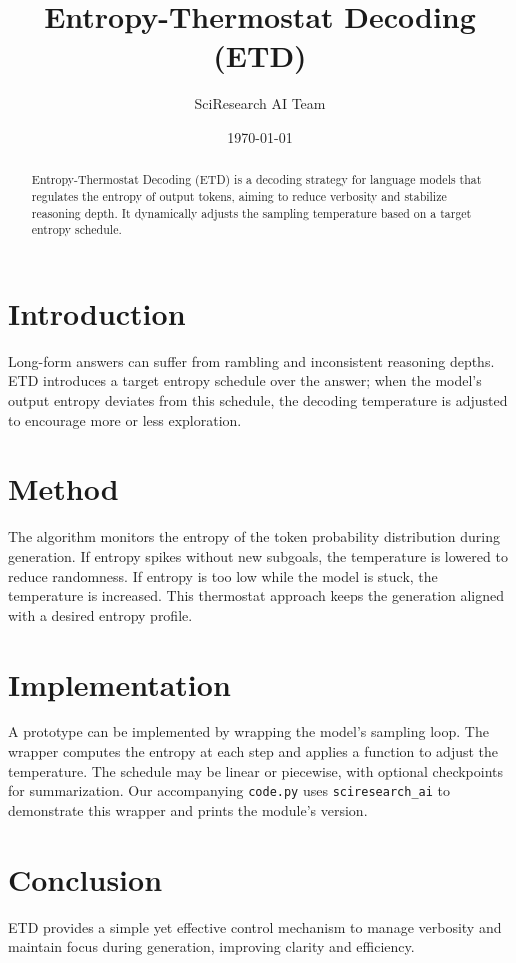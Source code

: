\documentclass{article}
\title{Entropy-Thermostat Decoding (ETD)}
\author{SciResearch AI Team}
\date{\today}
\begin{document}
\maketitle
\begin{abstract}
Entropy-Thermostat Decoding (ETD) is a decoding strategy for language
models that regulates the entropy of output tokens, aiming to reduce
verbosity and stabilize reasoning depth. It dynamically adjusts the
sampling temperature based on a target entropy schedule.
\end{abstract}
\section{Introduction}
Long-form answers can suffer from rambling and inconsistent reasoning
depths. ETD introduces a target entropy schedule over the answer;
when the model's output entropy deviates from this schedule, the
decoding temperature is adjusted to encourage more or less exploration.
\section{Method}
The algorithm monitors the entropy of the token probability distribution
during generation. If entropy spikes without new subgoals, the
temperature is lowered to reduce randomness. If entropy is too low
while the model is stuck, the temperature is increased. This
thermostat approach keeps the generation aligned with a desired entropy
profile.
\section{Implementation}
A prototype can be implemented by wrapping the model's sampling loop.
The wrapper computes the entropy at each step and applies a function to
adjust the temperature. The schedule may be linear or piecewise, with
optional checkpoints for summarization. Our accompanying
\texttt{code.py} uses \texttt{sciresearch\_ai} to demonstrate this
wrapper and prints the module's version.
\section{Conclusion}
ETD provides a simple yet effective control mechanism to manage
verbosity and maintain focus during generation, improving clarity and
efficiency.
\end{document}
